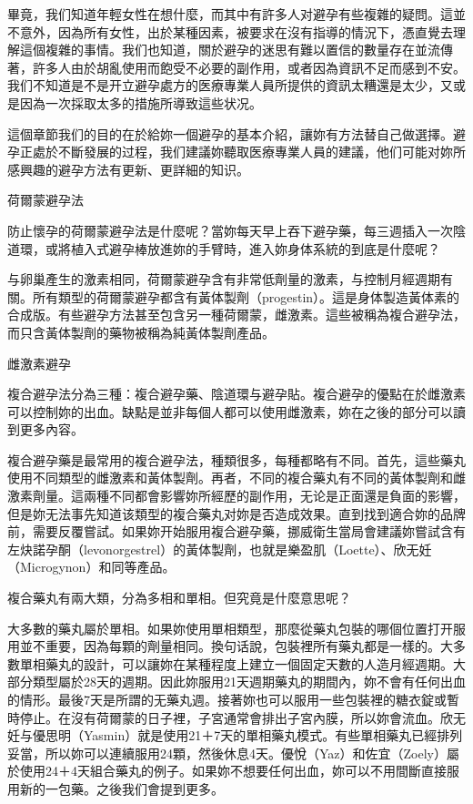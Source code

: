 \documentclass[12pt,UTF8]{ctexbook}
\begin{document}
畢竟，我们知道年輕女性在想什麼，而其中有許多人对避孕有些複雜的疑問。這並不意外，因為所有女性，出於某種因素，被要求在沒有指導的情況下，憑直覺去理解這個複雜的事情。我们也知道，關於避孕的迷思有難以置信的數量存在並流傳著，許多人由於胡亂使用而飽受不必要的副作用，或者因為資訊不足而感到不安。我们不知道是不是开立避孕處方的医療專業人員所提供的資訊太糟還是太少，又或是因為一次採取太多的措施所導致這些状况。

這個章節我们的目的在於給妳一個避孕的基本介紹，讓妳有方法替自己做選擇。避孕正處於不斷發展的过程，我们建議妳聽取医療專業人員的建議，他们可能对妳所感興趣的避孕方法有更新、更詳細的知识。





荷爾蒙避孕法




防止懷孕的荷爾蒙避孕法是什麼呢？當妳每天早上吞下避孕藥，每三週插入一次陰道環，或將植入式避孕棒放進妳的手臂時，進入妳身体系統的到底是什麼呢？

与卵巢產生的激素相同，荷爾蒙避孕含有非常低劑量的激素，与控制月經週期有關。所有類型的荷爾蒙避孕都含有黃体製劑（progestin）。這是身体製造黃体素的合成版。有些避孕方法甚至包含另一種荷爾蒙，雌激素。這些被稱為複合避孕法，而只含黃体製劑的藥物被稱為純黃体製劑產品。





雌激素避孕




複合避孕法分為三種：複合避孕藥、陰道環与避孕貼。複合避孕的優點在於雌激素可以控制妳的出血。缺點是並非每個人都可以使用雌激素，妳在之後的部分可以讀到更多內容。

複合避孕藥是最常用的複合避孕法，種類很多，每種都略有不同。首先，這些藥丸使用不同類型的雌激素和黃体製劑。再者，不同的複合藥丸有不同的黃体製劑和雌激素劑量。這兩種不同都會影響妳所經歷的副作用，无论是正面還是負面的影響，但是妳无法事先知道该類型的複合藥丸对妳是否造成效果。直到找到適合妳的品牌前，需要反覆嘗試。如果妳开始服用複合避孕藥，挪威衛生當局會建議妳嘗試含有左炔諾孕酮（levonorgestrel）的黃体製劑，也就是樂盈肌（Loette）、欣无妊（Microgynon）和同等產品。

複合藥丸有兩大類，分為多相和單相。但究竟是什麼意思呢？

大多數的藥丸屬於單相。如果妳使用單相類型，那麼從藥丸包裝的哪個位置打开服用並不重要，因為每顆的劑量相同。換句话說，包裝裡所有藥丸都是一樣的。大多數單相藥丸的設計，可以讓妳在某種程度上建立一個固定天數的人造月經週期。大部分類型屬於28天的週期。因此妳服用21天週期藥丸的期間內，妳不會有任何出血的情形。最後7天是所謂的无藥丸週。接著妳也可以服用一些包裝裡的糖衣錠或暫時停止。在沒有荷爾蒙的日子裡，子宮通常會排出子宮內膜，所以妳會流血。欣无妊与優思明（Yasmin）就是使用21＋7天的單相藥丸模式。有些單相藥丸已經排列妥當，所以妳可以連續服用24顆，然後休息4天。優悅（Yaz）和佐宜（Zoely）屬於使用24＋4天組合藥丸的例子。如果妳不想要任何出血，妳可以不用間斷直接服用新的一包藥。之後我们會提到更多。
\end{document}
